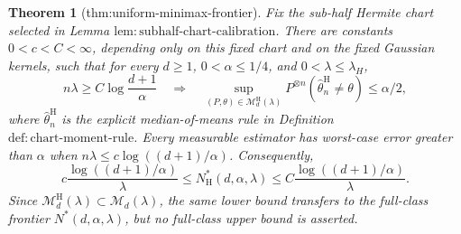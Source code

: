 \documentclass{article}
\newtheorem{theorem}{Theorem}
\begin{document}
\begin{theorem}[thm:uniform-minimax-frontier]\label{thm:uniform-minimax-frontier}
Fix the sub-half Hermite chart selected in Lemma \(\mathrm{lem:subhalf\text{-}chart\text{-}calibration}\).  There are constants \(0<c<C<\infty\), depending only on this fixed chart and on the fixed Gaussian kernels, such that for every \(d\ge1\), \(0<\alpha\le1/4\), and \(0<\lambda\le\lambda_H\),
\[
n\lambda\ge C\log\frac{d+1}{\alpha}
\quad\Longrightarrow\quad
\sup_{(P,\theta)\in\mathcal M_d^{\mathrm H}(\lambda)}
P^{\otimes n}(\widehat\theta_n^{\mathrm H}\ne\theta)\le\alpha/2,
\]
where \(\widehat\theta_n^{\mathrm H}\) is the explicit median-of-means rule in Definition \(\mathrm{def:chart\text{-}moment\text{-}rule}\).  Every measurable estimator has worst-case error greater than \(\alpha\) when \(n\lambda\le c\log((d+1)/\alpha)\).  Consequently,
\[
c\frac{\log((d+1)/\alpha)}{\lambda}
\le N_{\mathrm H}^*(d,\alpha,\lambda)
\le C\frac{\log((d+1)/\alpha)}{\lambda}.
\]
Since \(\mathcal M_d^{\mathrm H}(\lambda)\subset\mathcal M_d(\lambda)\), the same lower bound transfers to the full-class frontier \(N^*(d,\alpha,\lambda)\), but no full-class upper bound is asserted.
\end{theorem}
\end{document}
